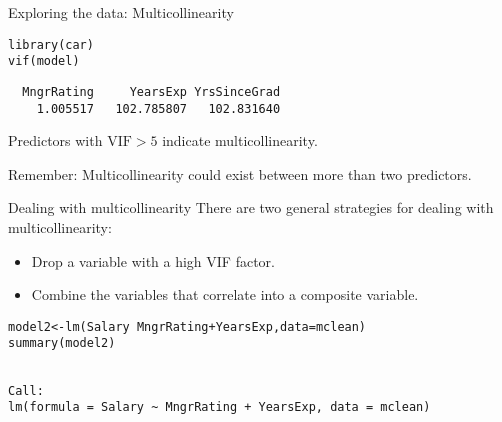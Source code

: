 \documentclass{beamer}\usepackage[]{graphicx}\usepackage[]{color}
\makeatletter
\newcommand{\hlopt}[1]{\textcolor[rgb]{1,0.894,0.769}{#1}}%
\newcommand{\hlstd}[1]{\textcolor[rgb]{1,0.894,0.769}{#1}}%
\newcommand{\hlkwb}[1]{\textcolor[rgb]{0.804,0.776,0.451}{#1}}%
\newcommand{\hlkwc}[1]{\textcolor[rgb]{0.78,0.941,0.545}{#1}}%
\newcommand{\hlkwd}[1]{\textcolor[rgb]{1,0.78,0.769}{#1}}%
\newenvironment{kframe}{%
 \def\at@end@of@kframe{}%
 \ifinner\ifhmode%
  \def\at@end@of@kframe{\end{minipage}}%
  \begin{minipage}{\columnwidth}%
 \fi\fi%
 \def\FrameCommand##1{\hskip\@totalleftmargin \hskip-\fboxsep
 \colorbox{shadecolor}{##1}\hskip-\fboxsep
     \hskip-\linewidth \hskip-\@totalleftmargin \hskip\columnwidth}%
 \MakeFramed {\advance\hsize-\width
   \@totalleftmargin\z@ \linewidth\hsize
   \@setminipage}}%
 {\par\unskip\endMakeFramed%
 \at@end@of@kframe}
\newenvironment{knitrout}{}{} %
\makeatother
\begin{document}
\begin{darkframes}
    \begin{frame}[fragile]{Exploring the data: Multicollinearity}
\begin{knitrout}
\color{fgcolor}\begin{kframe}
\begin{alltt}
\hlkwd{library}\hlstd{(car)}
\hlkwd{vif}\hlstd{(model)}
\end{alltt}
\begin{verbatim}
  MngrRating     YearsExp YrsSinceGrad 
    1.005517   102.785807   102.831640 
\end{verbatim}
\end{kframe}
\end{knitrout}
      Predictors with $\text{VIF} > 5$ indicate multicollinearity.
      \pause\bigskip

      \alert{Remember:} Multicollinearity could exist between more than two predictors.
    \end{frame}

    \begin{frame}
    \end{frame}

    \begin{frame}{Dealing with multicollinearity}
      There are two general strategies for dealing with multicollinearity:
      \begin{itemize}
        \item Drop a variable with a high VIF factor.
        \item Combine the variables that correlate into a composite variable.
      \end{itemize}
    \end{frame}

    \begin{frame}[fragile]%
      \fontsize{9}{9}\selectfont
\begin{knitrout}
\color{fgcolor}\begin{kframe}
\begin{alltt}
\hlstd{model2} \hlkwb{<-} \hlkwd{lm}\hlstd{(Salary} \hlopt{~} \hlstd{MngrRating} \hlopt{+} \hlstd{YearsExp,} \hlkwc{data}\hlstd{=mclean)}
\hlkwd{summary}\hlstd{(model2)}
\end{alltt}
\begin{verbatim}

Call:
lm(formula = Salary ~ MngrRating + YearsExp, data = mclean)


\end{verbatim}
\end{kframe}
\end{knitrout}
\end{frame}
\end{darkframes}
\end{document}

